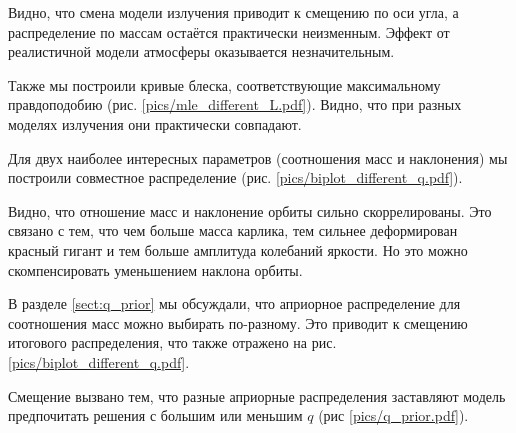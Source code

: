 
Видно, что смена модели излучения приводит к смещению по оси угла, а распределение по массам остаётся практически неизменным. Эффект от реалистичной модели атмосферы оказывается незначительным.

Также мы построили кривые блеска, соответствующие максимальному правдоподобию (рис. \ref{pics/mle_different_L.pdf}). Видно, что при разных моделях излучения они практически совпадают.




Для двух наиболее интересных параметров (соотношения масс и наклонения) мы построили совместное распределение (рис. \ref{pics/biplot_different_q.pdf}).

Видно, что отношение масс и наклонение орбиты сильно скоррелированы. Это связано с тем, что чем больше масса карлика, тем сильнее деформирован красный гигант и тем больше амплитуда колебаний яркости. Но это можно скомпенсировать уменьшением наклона орбиты.

В разделе \ref{sect:q_prior} мы обсуждали, что априорное распределение для соотношения масс можно выбирать по-разному. Это приводит к смещению итогового распределения, что также отражено на рис. \ref{pics/biplot_different_q.pdf}.

Смещение вызвано тем, что разные априорные распределения заставляют модель предпочитать решения с большим или меньшим $q$ (рис \ref{pics/q_prior.pdf}).


